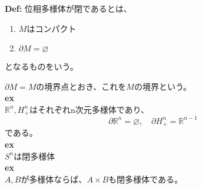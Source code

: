 \documentclass[a4paper,11pt]{jsarticle}
\numberwithin{equation}{section}
\begin{document}
\begin{itembox}[l]{\textbf{Def:}}
  位相多様体が閉であるとは、
  \begin{enumerate}
    \item $M$はコンパクト
    \item $\partial M = \varnothing$
    \end{enumerate}
    となるものをいう。
\end{itembox}

$\partial M = \text{$M$の境界点}$とおき、これを$M$の境界という。\\

\textbf{ex}\\
$\mathbb{R}^n, H^n_+$はそれぞれn次元多様体であり、
\begin{equation}
  \partial \mathbb{R}^n = \varnothing, \quad \partial H^n_+ = \mathbb{R}^{n-1}
\end{equation}
である。\\

\textbf{ex}\\
$S^n$は閉多様体\\

\textbf{ex}\\
$A,B$が多様体ならば、$A \times B$も閉多様体である。\\
\end{document}
